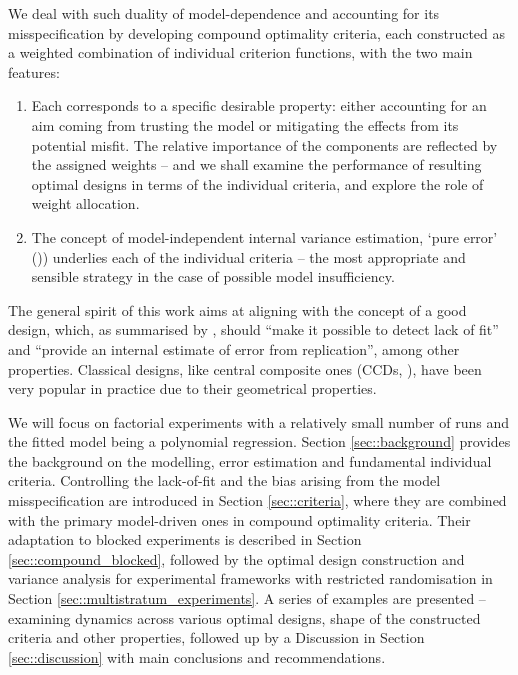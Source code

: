 \documentclass[11pt]{article}
\begin{document}
We deal with such duality of model-dependence and accounting for its misspecification by developing compound optimality criteria, each constructed as a weighted combination of individual criterion functions, with the two main features:
\begin{enumerate}
	\item Each corresponds to a specific desirable property:  either accounting for an aim coming from trusting the model or mitigating the effects from its potential misfit. The relative importance of the components are reflected by the assigned weights -- and we shall examine the performance of resulting optimal designs in terms of the individual criteria, and explore the role of weight allocation.
	\item The concept of model-independent internal variance estimation, `pure error' (\cite{GilmourTrinca2012})) underlies each of the individual criteria -- the most appropriate and sensible strategy in the case of possible model insufficiency. 
 \end{enumerate}

The general spirit of this work aims at aligning with the concept of a good design, which, as summarised by \cite{Box1987empirical},  should ``make it possible to detect lack of fit'' and ``provide an internal estimate of error from replication'', among other properties. Classical designs, like central composite ones (CCDs, \cite{Myers2009}), have been very popular in practice due to their geometrical properties.

We will focus on factorial experiments with a relatively small number of runs and the fitted model being a polynomial regression. Section \ref{sec::background} provides the background on the modelling, error estimation and fundamental individual criteria. Controlling the lack-of-fit and the bias arising from the model misspecification are introduced in Section \ref{sec::criteria}, where they are combined with the primary model-driven ones in compound optimality criteria. Their adaptation to blocked experiments is described in Section \ref{sec::compound_blocked}, followed by the optimal design construction and variance analysis for experimental frameworks with restricted randomisation in Section \ref{sec::multistratum_experiments}.
A series of examples are  presented -- examining dynamics across various optimal designs,  shape of the constructed criteria and other properties, followed up by a Discussion in Section \ref{sec::discussion} with main conclusions and recommendations. 
\end{document}
